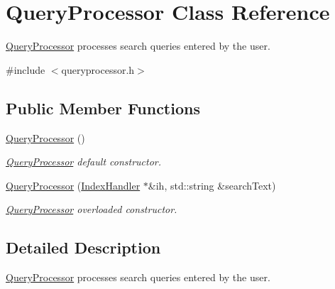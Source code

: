 \hypertarget{class_query_processor}{\section{Query\-Processor Class Reference}
\label{class_query_processor}
}


\hyperlink{class_query_processor}{Query\-Processor} processes search queries entered by the user.  




{\ttfamily \#include $<$queryprocessor.\-h$>$}

\subsection*{Public Member Functions}
\begin{DoxyCompactItemize}
\item 
\hypertarget{class_query_processor_a32a6760ff0aab51b38fb8eb236e2e140}{\hyperlink{class_query_processor_a32a6760ff0aab51b38fb8eb236e2e140}{Query\-Processor} ()}\label{class_query_processor_a32a6760ff0aab51b38fb8eb236e2e140}

\begin{DoxyCompactList}\small\item\em \hyperlink{class_query_processor}{Query\-Processor} default constructor. \end{DoxyCompactList}\item 
\hyperlink{class_query_processor_aa9ad73b1a64d758e127d9d52f43201ce}{Query\-Processor} (\hyperlink{class_index_handler}{Index\-Handler} $\ast$\&ih, std\-::string \&search\-Text)
\begin{DoxyCompactList}\small\item\em \hyperlink{class_query_processor}{Query\-Processor} overloaded constructor. \end{DoxyCompactList}\end{DoxyCompactItemize}


\subsection{Detailed Description}
\hyperlink{class_query_processor}{Query\-Processor} processes search queries entered by the user. 

